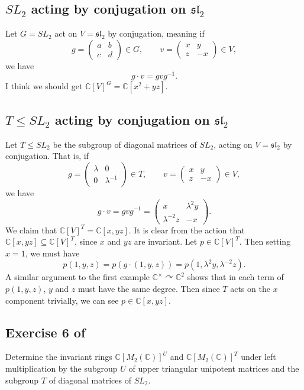 \documentclass[12pt]{amsart}
\newcommand{\C}{\mathbb{C}}
\theoremstyle{remark}
\theoremstyle{remark}
\begin{document}
\subsection*{$SL_2$ acting by conjugation on $\mathfrak{sl}_2$}
Let $G = SL_2$ act on $V = \mathfrak{sl}_2$ by conjugation, meaning if
$$
g=\begin{pmatrix} a & b \\ c & d \end{pmatrix} \in G, 
\qquad
v=\begin{pmatrix} x & y \\ z & -x \end{pmatrix} \in V,
$$
we have
$$
g \cdot v = g v g^{-1}.
$$
I think we should get $\C[V]^G = \C[x^2 + yz]$.

\subsection*{$T \le SL_2$ acting by conjugation on $\mathfrak{sl}_2$}
Let $T \le SL_2$ be the subgroup of diagonal matrices of $SL_2$, acting on $V = \mathfrak{sl}_2$ by conjugation.
That is, if
$$
g = \begin{pmatrix} \lambda & 0 \\ 0 & \lambda^{-1} \end{pmatrix} \in T,
\qquad
v = \begin{pmatrix} x & y \\ z & -x \end{pmatrix} \in V,
$$
we have
$$g \cdot v = g v g^{-1} =
\begin{pmatrix} x & \lambda^2 y \\ \lambda^{-2} z & -x \end{pmatrix}.$$
We claim that $\C[V]^T = \C[x, yz]$.
It is clear from the action that $\C[x, yz] \subseteq \C[V]^T$, since $x$ and $yz$ are invariant.
Let $p \in \C[V]^T$.
Then setting $x =1$, we must have
$$p(1, y, z) = p(g\cdot(1, y, z)) = p(1, \lambda^2 y, \lambda^{-2} z).$$
A similar argument to the first example $\C^\times \curvearrowright \C^2$ shows that in each term of $p(1, y, z)$, $y$ and $z$ must have the same degree.
Then since $T$ acts on the $x$ component trivially, we can see $p \in \C[x, yz]$.

\subsection*{Exercise 6 of \cite{KP96}}
Determine the invariant rings $\C[M_2(\C)]^U$ and $\C[M_2(\C)]^T$ under left multiplication by the subgroup $U$ of upper triangular unipotent matrices and the subgroup $T$ of diagonal matrices of $SL_2$.
\end{document}
